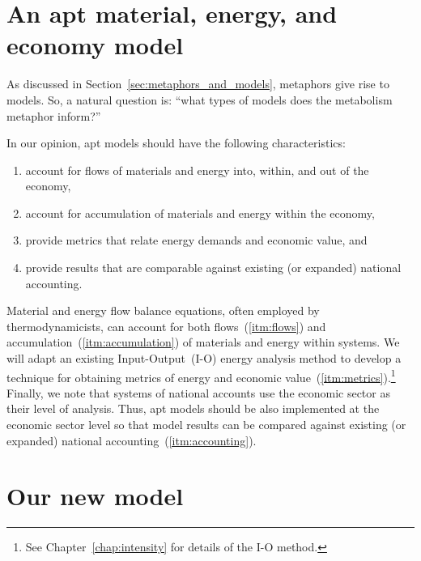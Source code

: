 \section{An apt material, energy, and economy model}
\label{sec:apt_models}

As discussed in Section~\ref{sec:metaphors_and_models}, 
metaphors give rise to models.
So, a natural question is: 
``what types of models does the metabolism metaphor inform?''

In our opinion, apt models should have the following characteristics:

\begin{enumerate}
	\item{\label{itm:flows}account for flows of materials and energy 
			into, within, and out of the economy,}
	\item{\label{itm:accumulation}account for accumulation of materials and energy 
			within the economy,}
	\item{\label{itm:metrics}provide metrics that relate energy demands and economic value, and}
	\item{\label{itm:accounting}provide results that are comparable against existing 
			(or expanded) national accounting.}
\end{enumerate}

Material and energy flow balance equations, 
often employed by thermodynamicists, 
can account for both flows~(\ref{itm:flows}) and accumulation~(\ref{itm:accumulation}) 
of materials and energy within systems.
We will adapt an existing Input-Output~(I-O)
energy analysis method to develop a 
technique for obtaining metrics 
of energy and economic value~(\ref{itm:metrics}).\footnote{See Chapter~\ref{chap:intensity}
for details of the I-O method.}
Finally, we note that systems of national accounts use the economic sector
as their level of analysis. 
Thus, apt models should be also implemented at the economic sector level
so that model results can be 
compared against existing (or expanded) national accounting~(\ref{itm:accounting}).


\section{Our new model}
\label{sec:our_new_model}

%
%
%


